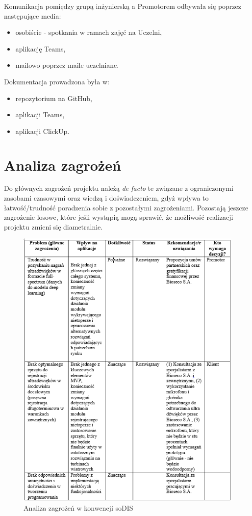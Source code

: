\documentclass{sprz}
\begin{document}
  Komunikacja pomiędzy grupą inżynierską a Promotorem odbywała się poprzez następujące media:
\begin{itemize}
  \item{osobiście - spotkania w ramach zajęć na Uczelni,}
  \item{aplikację Teams,}
  \item{mailowo poprzez maile uczelniane.}
  \end{itemize}

Dokumentacja prowadzona była w:
\begin{itemize}
  \item{repozytorium na GitHub,}
  \item{aplikacji Teams,}
  \item{aplikacji ClickUp.}
  \end{itemize}

\section{Analiza zagrożeń}

Do głównych zagrożeń projektu należą \textit{de facto} te związane z ograniczonymi zasobami czasowymi oraz wiedzą i doświadczeniem, gdyż wpływa to łatwość/trudność poradzenia sobie z pozostałymi zagrożeniami. Pozostają jeszcze zagrożenie losowe, które jeśli wystąpią mogą sprawić, że możliwość realizacji projektu zmieni się diametralnie.

\begin{figure}[h]
  \centering
  \includegraphics[width=1.0\textwidth]{sprz/sodis1.png}
  \caption{Analiza zagrożeń w konwencji soDIS}
  \label{img:sodis1}
\end{figure}
\end{document}
